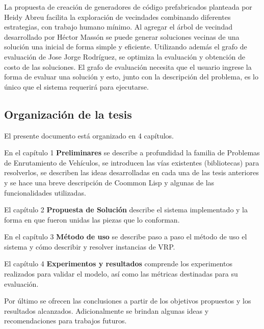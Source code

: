 La propuesta de creación de generadores de código prefabricados planteada por Heidy Abreu facilita la exploración de vecindades combinando diferentes estrategias, con trabajo humano mínimo. Al agregar el árbol de vecindad desarrollado por Héctor Massón se puede generar soluciones vecinas de una solución una inicial de forma simple y eficiente. Utilizando además el grafo de evaluación de Jose Jorge Rodríguez, se optimiza la evaluación y obtención de costo de las soluciones. El grafo de evaluación necesita que el usuario ingrese la forma de evaluar una solución y esto, junto con la descripción del problema, es lo único que el sistema requerirá para ejecutarse.

\subsection*{Organización de la tesis}

El presente documento está organizado en 4 capítulos.


En el capítulo 1 \textbf{Preliminares} se describe a profundidad la familia de Problemas de Enrutamiento de Vehículos, se introducen las vías existentes (bibliotecas) para resolverlos, se describen las ideas desarrolladas en cada una de las tesis anteriores y se hace una breve descripción de Coommon Lisp y algunas de las funcionalidades utilizadas.

El capítulo 2 \textbf{Propuesta de Solución} describe el sistema implementado y la forma en que fueron unidas las piezas que lo conforman.

En el capítulo 3 \textbf{Método de uso} se describe paso a paso el método de uso el sistema y cómo describir y resolver instancias de VRP.

El capítulo 4 \textbf{Experimentos y resultados} comprende los experimentos realizados para validar el modelo, así como las métricas destinadas para su evaluación. 

Por último se ofrecen las conclusiones a partir de los objetivos propuestos y los resultados alcanzados. Adicionalmente se brindan algunas ideas y recomendaciones para trabajos futuros.





